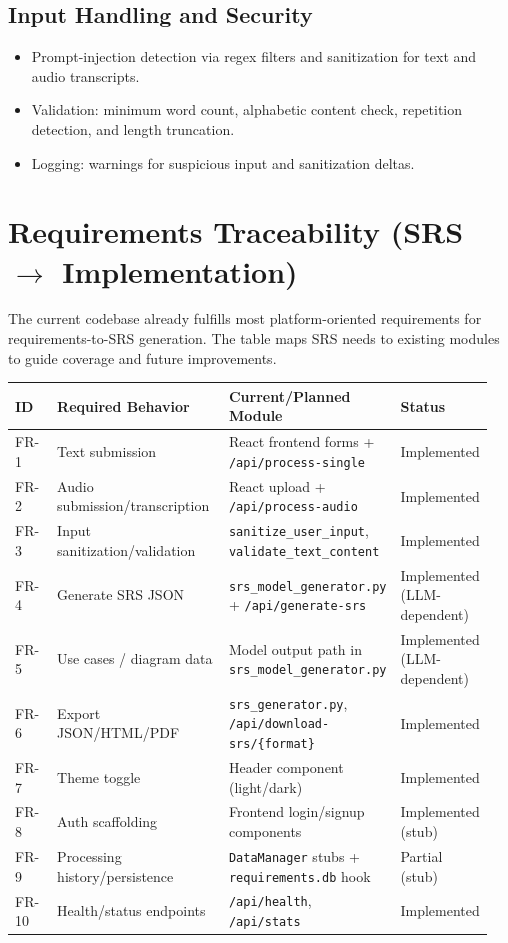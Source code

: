 \documentclass[11pt]{article}
\begin{document}
\subsection{Input Handling and Security}
\begin{itemize}
  \item Prompt-injection detection via regex filters and sanitization for text and audio transcripts.
  \item Validation: minimum word count, alphabetic content check, repetition detection, and length truncation.
  \item Logging: warnings for suspicious input and sanitization deltas.
\end{itemize}

\section{Requirements Traceability (SRS $\rightarrow$ Implementation)}
The current codebase already fulfills most platform-oriented requirements for requirements-to-SRS generation. The table maps SRS needs to existing modules to guide coverage and future improvements.

\begin{longtable}{p{0.13\linewidth} p{0.42\linewidth} p{0.28\linewidth} p{0.12\linewidth}}
\toprule
\textbf{ID} & \textbf{Required Behavior} & \textbf{Current/Planned Module} & \textbf{Status} \\
\midrule
FR-1 & Text submission & React frontend forms + \texttt{/api/process-single} & Implemented \\
FR-2 & Audio submission/transcription & React upload + \texttt{/api/process-audio} & Implemented \\
FR-3 & Input sanitization/validation & \texttt{sanitize\_user\_input}, \texttt{validate\_text\_content} & Implemented \\
FR-4 & Generate SRS JSON & \texttt{srs\_model\_generator.py} + \texttt{/api/generate-srs} & Implemented (LLM-dependent) \\
FR-5 & Use cases / diagram data & Model output path in \texttt{srs\_model\_generator.py} & Implemented (LLM-dependent) \\
FR-6 & Export JSON/HTML/PDF & \texttt{srs\_generator.py}, \texttt{/api/download-srs/\{format\}} & Implemented \\
FR-7 & Theme toggle & Header component (light/dark) & Implemented \\
FR-8 & Auth scaffolding & Frontend login/signup components & Implemented (stub) \\
FR-9 & Processing history/persistence & \texttt{DataManager} stubs + \texttt{requirements.db} hook & Partial (stub) \\
FR-10 & Health/status endpoints & \texttt{/api/health}, \texttt{/api/stats} & Implemented \\
\bottomrule
\end{longtable}
\end{document}
